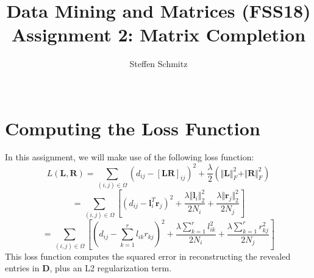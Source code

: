\documentclass{support/acm_proc_article-sp}
\begin{document}
    \title{Data Mining and Matrices (FSS18) \\ Assignment 2: Matrix Completion}

    \author{
    \alignauthor
    Steffen Schmitz\\
    \\
    }

    \maketitle


    \section{Computing the Loss Function}
    \label{sec:loss-function}

    In this assignment, we will make use of the following loss function:
    \begin{equation}
        L(\mathbf{L}, \mathbf{R}) = \sum_{(i,j)\in \Omega} (d_{ij} - [\mathbf{LR}]_{ij})^2
            + \frac{\lambda}{2}(\Vert \mathbf{L} \Vert_F^2 + \Vert \mathbf{R} \Vert_F^2)
        \label{eq:loss-matrix}
    \end{equation}
    \begin{equation}
        = \sum_{(i,j)\in \Omega} \left[ (d_{ij} - \mathbf{l}_i^T \mathbf{r}_j)^2
            + \frac{\lambda \Vert \mathbf{l}_i \Vert_2^2}{2N_i}
            + \frac{\lambda \Vert \mathbf{r}_j \Vert_2^2}{2N_j} \right]
        \label{eq:loss-vector}
    \end{equation}
    \begin{equation}
        = \sum_{(i,j)\in \Omega} \left[ \left(d_{ij} - \sum_{k=1}^r l_{ik}r_{kj} \right)^2
        + \frac{\lambda\sum_{k=1}^r l_{ik}^2}{2N_i}
        + \frac{\lambda\sum_{k=1}^r r_{kj}^2}{2N_j} \right]
        \label{eq:loss-scalar}
    \end{equation}
    This loss function computes the squared error in reconstructing the revealed
    entries in $\mathbf{D}$, plus an L2 regularization term.

\end{document}
